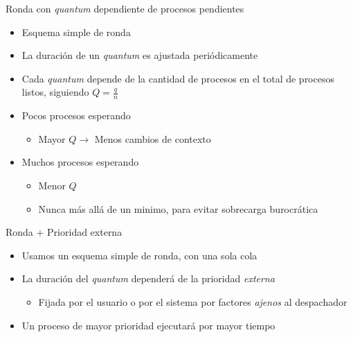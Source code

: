 \documentclass[presentation]{beamer}
\begin{document}
\begin{frame}[label={sec:org479d209}]{Ronda con \emph{quantum} dependiente de procesos pendientes}
\begin{itemize}
\item Esquema simple de ronda
\item La duración de un \emph{quantum} es ajustada periódicamente
\item Cada \emph{quantum} depende de la cantidad de procesos en el total de
procesos listos, siguiendo \(Q=\frac{q}{n}\)
\item Pocos procesos esperando
\begin{itemize}
\item Mayor \(Q \rightarrow\) Menos cambios de contexto
\end{itemize}
\item Muchos procesos esperando
\begin{itemize}
\item Menor \(Q\)
\item Nunca más allá de un minimo, para evitar sobrecarga burocrática
\end{itemize}
\end{itemize}
\end{frame}

\begin{frame}[label={sec:orgf27e056}]{Ronda + Prioridad externa}
\begin{itemize}
\item Usamos un esquema simple de ronda, con una sola cola
\item La duración del \emph{quantum} dependerá de la prioridad \emph{externa}
\begin{itemize}
\item Fijada por el usuario o por el sistema por factores \emph{ajenos} al
despachador
\end{itemize}
\item Un proceso de mayor prioridad ejecutará por mayor tiempo
\end{itemize}
\end{frame}
\end{document}
